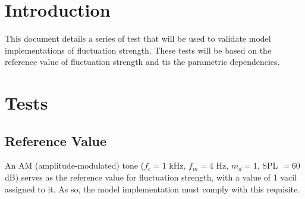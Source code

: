 \documentclass[a4paper]{article}
\begin{document}

\section{Introduction}

This document details a series of test that will be used to validate model
implementations of fluctuation strength. These tests will be based on the
reference value of fluctuation strength and tis the parametric dependencies.

\section{Tests}

\subsection{Reference Value}

An AM (amplitude-modulated) tone ($f_c = 1$ kHz, $f_m = 4$ Hz, $m_d = 1$,
SPL $=60$ dB) serves as the reference value for fluctuation strength, with a
value of 1 vacil assigned to it. As so, the model implementation must comply
with this requisite.



\end{document}
